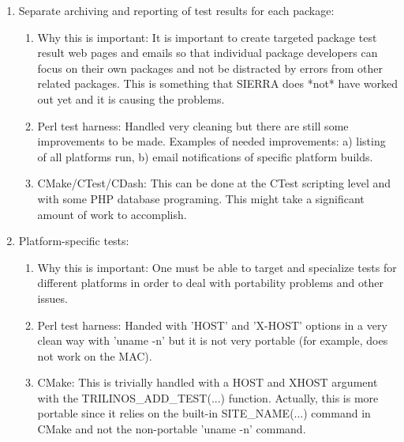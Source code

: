 \documentclass[pdf,ps2pdf,11pt]{SANDreport}
\begin{document}
\begin{enumerate}

{}\item Separate archiving and reporting of test results for each
package:

  \begin{enumerate}

  {}\item Why this is important: It is important to create targeted
  package test result web pages and emails so that individual package
  developers can focus on their own packages and not be distracted by
  errors from other related packages.  This is something that SIERRA
  does *not* have worked out yet and it is causing the problems.

  {}\item Perl test harness: Handled very cleaning but there are still
  some improvements to be made.  Examples of needed improvements: a)
  listing of all platforms run, b) email notifications of specific
  platform builds.

  {}\item CMake/CTest/CDash: This can be done at the CTest scripting
  level and with some PHP database programing.  This might take a
  significant amount of work to accomplish.

  \end{enumerate}

{}\item Platform-specific tests:

  \begin{enumerate}

  {}\item Why this is important: One must be able to target and
  specialize tests for different platforms in order to deal with
  portability problems and other issues.

  {}\item Perl test harness: Handed with 'HOST' and 'X-HOST' options
  in a very clean way with 'uname -n' but it is not very portable (for
  example, does not work on the MAC).

  {}\item CMake: This is trivially handled with a HOST and XHOST
  argument with the TRILINOS\_ADD\_TEST(...) function.  Actually, this
  is more portable since it relies on the built-in SITE\_NAME(...) 
  command in CMake and not the non-portable 'uname -n' command.

  \end{enumerate}


\end{enumerate}
\end{document}
